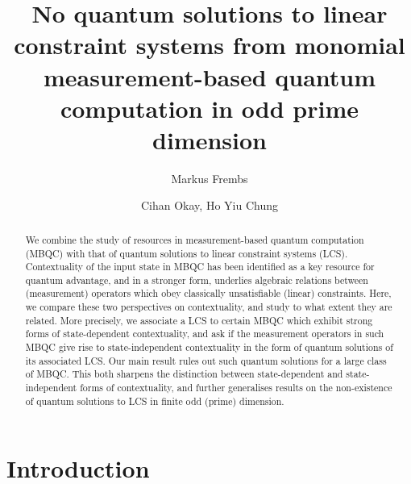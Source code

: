\documentclass[aps,pra,letterpaper,onrcolumn,nofootinbib,notitlepage,longbibliography]{revtex4-1}
\begin{document}
\title{No quantum solutions to linear constraint systems from monomial measurement-based quantum computation in odd prime dimension}
\author{Markus Frembs}
\author{Cihan Okay, Ho Yiu Chung}



\begin{abstract}
    We combine the study of resources in measurement-based quantum computation (MBQC) with that of quantum solutions to linear constraint systems (LCS). Contextuality of the input state in MBQC has been identified as a key resource for quantum advantage, and in a stronger form, underlies algebraic relations between (measurement) operators which obey classically unsatisfiable (linear) constraints. Here, we compare these two perspectives on contextuality, and study to what extent they are related. More precisely, we associate a LCS to certain MBQC which exhibit strong forms of state-dependent contextuality, and ask if the measurement operators in such MBQC give rise to state-independent contextuality in the form of quantum solutions of its associated LCS. Our main result rules out such quantum solutions for a large class of MBQC. This both sharpens the distinction between state-dependent and state-independent forms of contextuality, and further generalises results on the non-existence of quantum solutions to LCS in finite odd (prime) dimension.
\end{abstract}
\maketitle

\vspace{-.75cm}



\section{Introduction}\label{sec: introduction}
\end{document}
